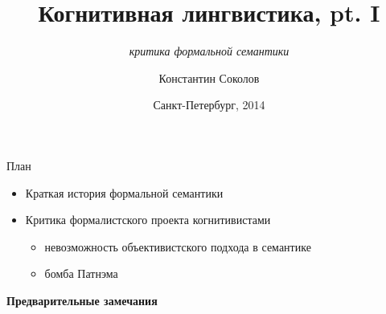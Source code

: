 \documentclass{beamer}
\begin{document}
\title{\Large{Когнитивная лингвистика, pt. I}}
\subtitle{\textit{критика формальной семантики}}
\author{Константин Соколов}
\date{Санкт-Петербург, 2014} 
\begin{frame}
    \thispagestyle{empty}
    \titlepage
\end{frame}

\begin{frame}{План}
\setcounter{framenumber}{1}
    \begin{itemize}
        \item Краткая история формальной семантики
        \medskip
        \item Критика формалистского проекта когнитивистами
        	\smallskip
        	\begin{itemize}
				\item невозможность объективистского подхода в семантике
				\item бомба Патнэма
        	\end{itemize}
    \end{itemize}
\end{frame}






\begin{frame}{}
\begin{center}
	\textbf{Предварительные замечания}
\end{center}
\end{frame}
\end{document}
